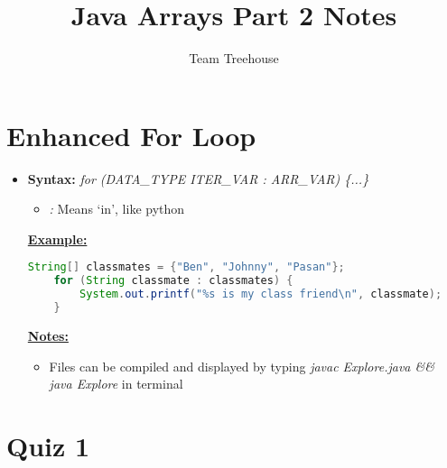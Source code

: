 \documentclass[12pt]{article}
\begin{document}
\title{Java Arrays Part 2 Notes}
\author{Team Treehouse}
\maketitle

\section{Enhanced For Loop}

\bigskip

\begin{itemize}
    \item \textbf{Syntax:} \textit{for (DATA\_TYPE ITER\_VAR : ARR\_VAR) \{...\}}
    \begin{itemize}
        \item \textit{:} Means `in', like python
    \end{itemize}

    \bigskip

    \underline{\textbf{Example:}}

    \bigskip

    \begin{lstlisting}[language=Java, caption={lesson\_01/Explore.java}]
    String[] classmates = {"Ben", "Johnny", "Pasan"};
    for (String classmate : classmates) {
        System.out.printf("%s is my class friend\n", classmate);
    }
    \end{lstlisting}

    \underline{\textbf{Notes:}}

    \bigskip

    \begin{itemize}
        \item Files can be compiled and displayed by typing \textit{javac Explore.java \&\& java Explore}
        in terminal
    \end{itemize}
\end{itemize}

\bigskip

\section{Quiz 1}

\bigskip
\end{document}
